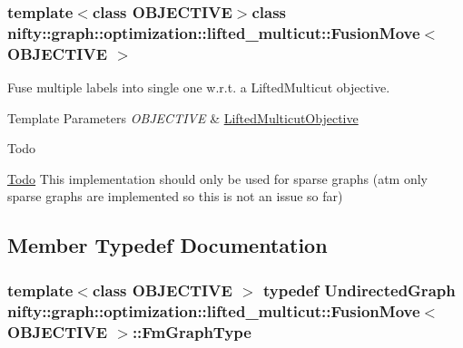 \subsubsection*{template$<$class O\+B\+J\+E\+C\+T\+I\+V\+E$>$class nifty\+::graph\+::optimization\+::lifted\+\_\+multicut\+::\+Fusion\+Move$<$ O\+B\+J\+E\+C\+T\+I\+V\+E $>$}

Fuse multiple labels into single one w.\+r.\+t. a Lifted\+Multicut objective. 


\begin{DoxyTemplParams}{Template Parameters}
{\em O\+B\+J\+E\+C\+T\+I\+V\+E} & \hyperlink{classnifty_1_1graph_1_1optimization_1_1lifted__multicut_1_1LiftedMulticutObjective}{Lifted\+Multicut\+Objective}\\
\hline
\end{DoxyTemplParams}
\begin{DoxyRefDesc}{Todo}
\item[\hyperlink{todo__todo000001}{Todo}]This implementation should only be used for sparse graphs (atm only sparse graphs are implemented so this is not an issue so far) \end{DoxyRefDesc}


\subsection{Member Typedef Documentation}
\hypertarget{classnifty_1_1graph_1_1optimization_1_1lifted__multicut_1_1FusionMove_a3f941b1058456bd110d5b3ca687774af}{}
\subsubsection[{Fm\+Graph\+Type}]{\setlength{\rightskip}{0pt plus 5cm}template$<$class O\+B\+J\+E\+C\+T\+I\+V\+E $>$ typedef {\bf Undirected\+Graph} {\bf nifty\+::graph\+::optimization\+::lifted\+\_\+multicut\+::\+Fusion\+Move}$<$ O\+B\+J\+E\+C\+T\+I\+V\+E $>$\+::{\bf Fm\+Graph\+Type}}\label{classnifty_1_1graph_1_1optimization_1_1lifted__multicut_1_1FusionMove_a3f941b1058456bd110d5b3ca687774af}
\hypertarget{classnifty_1_1graph_1_1optimization_1_1lifted__multicut_1_1FusionMove_a1036b9c07018d8278e2d427cf00eac95}{}
